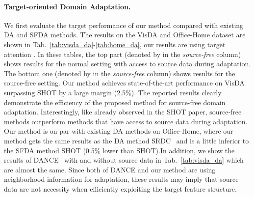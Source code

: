 \documentclass[10pt,twocolumn,letterpaper]{article}
\begin{document}
\paragraph{Target-oriented Domain Adaptation.}
We first evaluate the target performance of our method compared with existing DA and SFDA methods. The results on the VisDA and Office-Home dataset are shown in Tab.~\ref{tab:visda_da}-\ref{tab:home_da}, our results are using target attention . In these tables, the top part (denoted by  in the \textit{source-free} column) shows results for the normal setting with access to source data during adaptation. The bottom one (denoted by  in the \textit{source-free} column) shows results for the source-free setting. 
Our method achieves state-of-the-art performance on VisDA surpassing SHOT by a large margin (2.5\%). The reported results clearly demonstrate the efficiency of the proposed method for source-free domain adaptation. Interestingly, like already observed in the SHOT paper, source-free methods outperform methods that have access to source data during adaptation. Our method is on par with existing DA methods on Office-Home, where our method gets the same results as the DA method SRDC~\cite{tang2020unsupervised} and is a little inferior to the SFDA method SHOT (0.5\% lower than SHOT).{In addition, we show the results of DANCE~\cite{saito2020universal} with and without source data in Tab.~\ref{tab:visda_da} which are almost the same. Since both of DANCE and our method are using neighborhood information for adaptation, these results may imply that source data are not necessity when efficiently exploiting the target feature structure.}

\vspace{-2mm}
\end{document}
